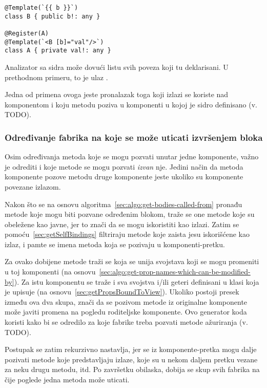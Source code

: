 \begin{lstlisting}
@Template(`{{ b }}`)
class B { public b!: any }

@Register(A)
@Template(`<B [b]="val"/>`)
class A { private val!: any }
\end{lstlisting}

Analizator sa sidra može dovući listu svih poveza koji tu deklarisani.
U prethodnom primeru, to je ulaz .

Jedna od primena ovoga jeste pronalazak toga koji izlazi se koriste nad komponentom i koju metodu poziva u komponenti u kojoj je sidro definisano (v. TODO).

\subsubsection{Određivanje fabrika na koje se može uticati izvršenjem bloka} %

Osim određivanja metoda koje se mogu pozvati unutar jedne komponente, važno je odrediti i koje metode se mogu pozvati \emph{izvan} nje.
Jedini način da metoda komponente pozove metodu druge komponente jeste ukoliko su komponente povezane izlazom.

Nakon što se na osnovu algoritma~\cref{sec:algo:get-bodies-called-from} pronađu metode koje mogu biti pozvane određenim blokom, traže se one metode koje su obeležene kao javne, jer to znači da se mogu iskoristiti kao izlazi.
Zatim se pomoću~\cref{sec:getSelfBindings} filtriraju metode koje zaista jesu iskorišćene kao izlaz, i pamte se imena metoda koja se pozivaju u komponenti-pretku.

Za ovako dobijene metode traži se koja se unija svojstava koji se mogu promeniti u toj komponenti (na osnovu~\cref{sec:algo:get-prop-names-which-can-be-modified-by}).
Za istu komponentu se traže i sva svojstva i/ili geteri definisani u klasi koja je upisuje (na osnovu~\cref{sec:getPropsBoundToView}).
Ukoliko postoji presek između ova dva skupa, znači da se pozivom metode iz originalne komponente može javiti promena na pogledu roditeljske komponente.
Ovo generator koda koristi kako bi se odredilo za koje fabrike treba pozvati metode ažuriranja (v. TODO).

Postupak se zatim rekurzivno nastavlja, jer se iz komponente-pretka mogu dalje pozivati metode koje predstavljaju izlaze, koje su u nekom daljem pretku vezane za neku drugu metodu, itd.
Po završetku obilaska, dobija se skup svih fabrika na čije poglede jedna metoda može uticati.

